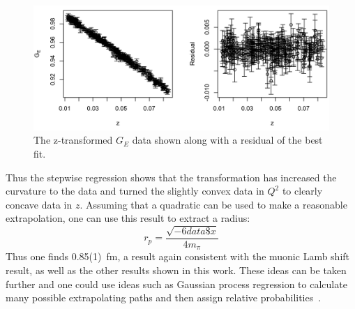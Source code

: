 \documentclass[10pt,superscriptaddress,aps,prc,twocolumn]{revtex4-1}
\begin{document}
\begin{appendix}
\begin{Verbatim}[fontsize=\footnotesize]
\end{Verbatim}

\begin{figure}[htb]
\includegraphics[width=\columnwidth]{Figure/ztransform-R-fit.png}
\caption{The z-transformed $G_E$ data shown along with a residual of the best fit.}
\end{figure}

Thus the stepwise regression shows that the transformation
has increased the curvature to the data and turned the slightly
convex data in $Q^2$ to clearly concave data in $z$.
Assuming that a quadratic can be used to make a reasonable extrapolation, one can
use this result to extract a radius:
\begin{equation}
r_p = \frac{\sqrt{-6data\$x}}{4 m_{\pi}}
\end{equation}
Thus one finds 0.85(1)~fm,  a result again consistent with the muonic Lamb shift result,
as well as the other results shown in this work.
These ideas can be taken further and one could use ideas such as Gaussian process 
regression to calculate many possible extrapolating paths and then assign relative 
probabilities~\cite{Rasmussen:2005}.

\end{appendix}


\end{document}
